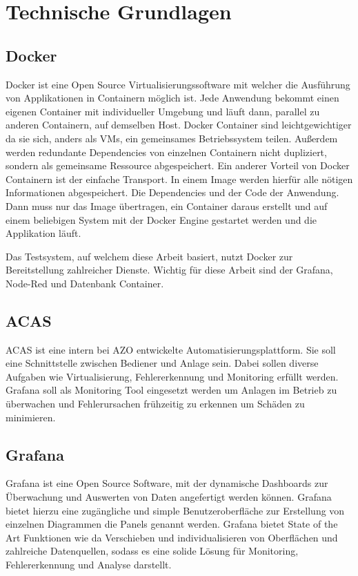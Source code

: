 \documentclass[a4paper, 12pt, oneside]{scrbook}
\begin{document}
	
		
	
	\chapter{Technische Grundlagen}
	
		\section{Docker}
			\noindent Docker ist eine Open Source Virtualisierungssoftware mit welcher die Ausführung von Applikationen in Containern möglich ist. Jede Anwendung bekommt einen eigenen Container mit individueller Umgebung und läuft dann, parallel zu anderen Containern, auf demselben Host. Docker Container sind leichtgewichtiger da sie sich, anders als VMs, ein gemeinsames Betriebssystem teilen. Außerdem werden redundante Dependencies von einzelnen Containern nicht dupliziert, sondern als gemeinsame Ressource abgespeichert. Ein anderer Vorteil von Docker Containern ist der einfache Transport. In einem Image werden hierfür alle nötigen Informationen abgespeichert. Die Dependencies und der Code der Anwendung. Dann muss nur das Image übertragen, ein Container daraus erstellt und auf einem beliebigen System mit der Docker Engine gestartet werden und die Applikation läuft.
			
			\noindent Das Testsystem, auf welchem diese Arbeit basiert, nutzt Docker zur Bereitstellung zahlreicher Dienste. Wichtig für diese Arbeit sind der Grafana, Node-Red und Datenbank Container.
			
		\section{ACAS}
			\noindent ACAS ist eine intern bei AZO entwickelte Automatisierungsplattform. Sie soll eine Schnittstelle zwischen Bediener und Anlage sein. Dabei sollen diverse Aufgaben wie Virtualisierung, Fehlererkennung und Monitoring erfüllt werden. Grafana soll als Monitoring Tool eingesetzt werden um Anlagen im Betrieb zu überwachen und Fehlerursachen frühzeitig zu erkennen um Schäden zu minimieren.
			
		\section{Grafana}
			\noindent Grafana ist eine Open Source Software, mit der dynamische Dashboards zur Überwachung und Auswerten von Daten angefertigt werden können. Grafana bietet hierzu eine zugängliche und simple Benutzeroberfläche zur Erstellung von einzelnen Diagrammen die Panels genannt werden. Grafana bietet State of the Art Funktionen wie da Verschieben und individualisieren von Oberflächen und zahlreiche Datenquellen, sodass es eine solide Lösung für Monitoring, Fehlererkennung und Analyse darstellt.
			
\end{document}
